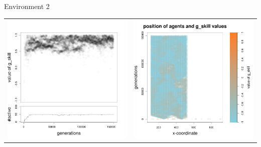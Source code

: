 \documentclass[8pt, handout=show,notes=show]{beamer}
\begin{document}
\begin{frame}{Environment 2}
\begin{table}[H]
\begin{tabular}{cc}
 \newline
 \includegraphics[width=\imgSize]{../images/5StaticEnv/Gplot92_staticEnv2}&\includegraphics[width=\imgSize]{../images/5StaticEnv/Gplot92Static_staticEnv2}\\
\end{tabular}

\end{table}
\end{frame}
\end{document}
